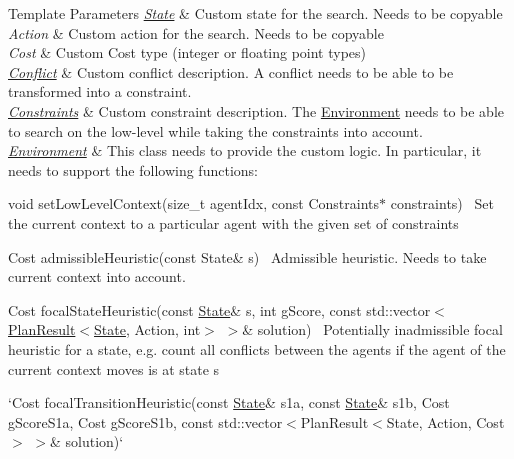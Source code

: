 \begin{DoxyTemplParams}{Template Parameters}
{\em \hyperlink{structlib_multi_robot_planning_1_1_state}{State}} & Custom state for the search. Needs to be copy\textquotesingle{}able \\
\hline
{\em Action} & Custom action for the search. Needs to be copy\textquotesingle{}able \\
\hline
{\em Cost} & Custom Cost type (integer or floating point types) \\
\hline
{\em \hyperlink{structlib_multi_robot_planning_1_1_conflict}{Conflict}} & Custom conflict description. A conflict needs to be able to be transformed into a constraint. \\
\hline
{\em \hyperlink{structlib_multi_robot_planning_1_1_constraints}{Constraints}} & Custom constraint description. The \hyperlink{classlib_multi_robot_planning_1_1_environment}{Environment} needs to be able to search on the low-\/level while taking the constraints into account. \\
\hline
{\em \hyperlink{classlib_multi_robot_planning_1_1_environment}{Environment}} & This class needs to provide the custom logic. In particular, it needs to support the following functions\+:
\begin{DoxyItemize}
\item {\ttfamily void set\+Low\+Level\+Context(size\+\_\+t agent\+Idx, const Constraints$\ast$ constraints)}~\newline
 Set the current context to a particular agent with the given set of constraints
\item {\ttfamily Cost admissible\+Heuristic(const State\& s)}~\newline
 Admissible heuristic. Needs to take current context into account.
\item {\ttfamily Cost focal\+State\+Heuristic(const \hyperlink{structlib_multi_robot_planning_1_1_state}{State}\& s, int g\+Score, const std\+::vector$<$\hyperlink{structlib_multi_robot_planning_1_1_plan_result}{Plan\+Result}$<$\hyperlink{structlib_multi_robot_planning_1_1_state}{State}, Action, int$>$ $>$\& solution)}~\newline
 Potentially inadmissible focal heuristic for a state, e.\+g. count all conflicts between the agents if the agent of the current context moves is at state s
\item `\+Cost focal\+Transition\+Heuristic(const \hyperlink{structlib_multi_robot_planning_1_1_state}{State}\& s1a, const \hyperlink{structlib_multi_robot_planning_1_1_state}{State}\& s1b, Cost g\+Score\+S1a, Cost g\+Score\+S1b, const std\+::vector$<$Plan\+Result$<$\+State, Action, Cost$>$ $>$\& solution)`~\newline

\end{DoxyItemize}
\end{DoxyTemplParams}
